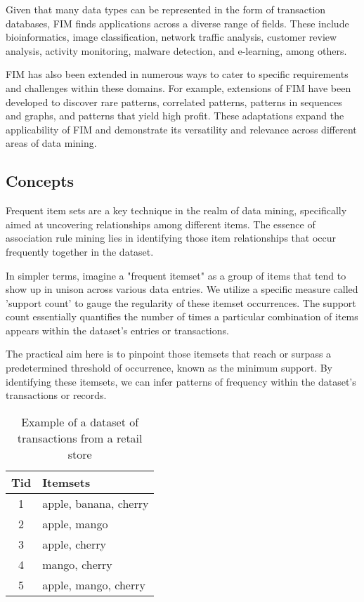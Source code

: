 Given that many data types can be represented in the form of transaction databases, FIM finds applications across a diverse range of fields. These include bioinformatics, image classification, network traffic analysis, customer review analysis, activity monitoring, malware detection, and e-learning, among others.

FIM has also been extended in numerous ways to cater to specific requirements and challenges within these domains. For example, extensions of FIM have been developed to discover rare patterns, correlated patterns, patterns in sequences and graphs, and patterns that yield high profit. These adaptations expand the applicability of FIM and demonstrate its versatility and relevance across different areas of data mining.

\subsection{Concepts}
Frequent item sets are a key technique in the realm of data mining\cite{fim_geeksforgeeks},
specifically aimed at uncovering relationships among different items.
The essence of association rule mining lies in identifying those item relationships that occur frequently together in the dataset.

In simpler terms, imagine a "frequent itemset" as a group of items that tend to show up in unison across various data entries. We utilize a specific measure called 'support count' to gauge the regularity of these itemset occurrences. The support count essentially quantifies the number of times a particular combination of items appears within the dataset's entries or transactions.

The practical aim here is to pinpoint those itemsets that reach or surpass a predetermined threshold of occurrence, known as the minimum support. By identifying these itemsets, we can infer patterns of frequency within the dataset's transactions or records.

\begin{table}[H]
    \centering
    \caption{Example of a dataset of transactions from a retail store}
    \label{tab:example_dataset_in_real}
    \begin{tabular}{|c|l|}
        \hline
        \textbf{Tid} & \textbf{Itemsets}     \\
        \hline
        1            & apple, banana, cherry \\
        2            & apple, mango          \\
        3            & apple, cherry         \\
        4            & mango, cherry         \\
        5            & apple, mango, cherry  \\
        \hline
    \end{tabular}
\end{table}

